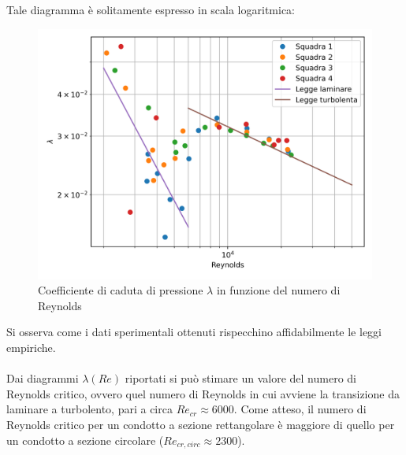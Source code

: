 \noindent Tale diagramma è solitamente espresso in scala logaritmica:
\begin{figure}[H]
    \centering
    \includegraphics[width=.92\textwidth]{images/7/lambdaloglog.png}
    \caption{Coefficiente di caduta di pressione $\lambda$ in funzione del numero di Reynolds}
\end{figure}

\noindent Si osserva come i dati sperimentali ottenuti rispecchino affidabilmente le leggi empiriche.\\\\
Dai diagrammi $\lambda(Re)$ riportati si può stimare un valore del numero di Reynolds critico, ovvero quel numero di Reynolds in cui avviene la transizione da laminare a turbolento, pari a circa $Re_{cr}\approx6000$. Come atteso, il numero di Reynolds critico per un condotto a sezione rettangolare è maggiore di quello per un condotto a sezione circolare ($Re_{cr,circ}\approx 2300$).